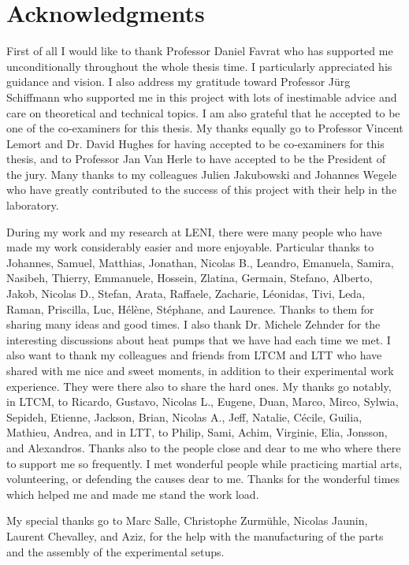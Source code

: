 \section*{Acknowledgments}
\label{sec:thanks}

First of all I would like to thank Professor Daniel Favrat who has
supported me unconditionally throughout the whole thesis time. I
particularly appreciated his guidance and vision. I also address my
gratitude toward Professor Jürg Schiffmann who supported me in this
project with lots of inestimable advice and care on theoretical and
technical topics. I am also grateful that he accepted to be one of the
co-examiners for this thesis. My thanks equally go to Professor
Vincent Lemort and Dr. David Hughes for having accepted to be
co-examiners for this thesis, and to Professor Jan Van Herle to have
accepted to be the President of the jury. Many thanks to my colleagues
Julien Jakubowski and Johannes Wegele who have greatly contributed to
the success of this project with their help in the laboratory.

During my work and my research at LENI, there were many people who
have made my work considerably easier and more enjoyable. Particular
thanks to Johannes, Samuel, Matthias, Jonathan, Nicolas B., Leandro,
Emanuela, Samira, Nasibeh, Thierry, Emmanuele, Hossein, Zlatina,
Germain, Stefano, Alberto, Jakob, Nicolas D., Stefan, Arata, Raffaele,
Zacharie, Léonidas, Tivi, Leda, Raman, Priscilla, Luc, Hélène,
Stéphane, and Laurence. Thanks to them for sharing many ideas and good
times. I also thank Dr. Michele Zehnder for the interesting
discussions about heat pumps that we have had each time we met. I also
want to thank my colleagues and friends from LTCM and LTT who have
shared with me nice and sweet moments, in addition to their
experimental work experience. They were there also to share the hard
ones. My thanks go notably, in LTCM, to Ricardo, Gustavo, Nicolas L.,
Eugene, Duan, Marco, Mirco, Sylwia, Sepideh, Etienne, Jackson, Brian,
Nicolas A., Jeff, Natalie, Cécile, Guilia, Mathieu, Andrea, and in
LTT, to Philip, Sami, Achim, Virginie, Elia, Jonsson, and
Alexandros. Thanks also to the people close and dear to me who where
there to support me so frequently. I met wonderful people while
practicing martial arts, volunteering, or defending the causes dear to
me. Thanks for the wonderful times which helped me and made me stand
the work load.

My special thanks go to Marc Salle, Christophe Zurmühle, Nicolas
Jaunin, Laurent Chevalley, and Aziz, for the help with the
manufacturing of the parts and the assembly of the experimental
setups.

